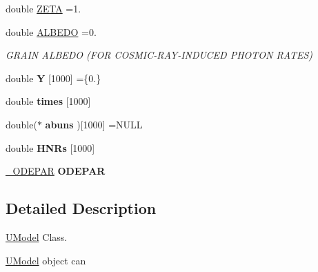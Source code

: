 \begin{DoxyCompactItemize}
\item 
double \hyperlink{classUModel_aa8280e76ef6df680f23902d267450c04}{Z\+E\+TA} =1.
\item 
\mbox{\label{classUModel_acaed1acb0533429fc4784fb79f0de04c}} 
double \hyperlink{classUModel_acaed1acb0533429fc4784fb79f0de04c}{A\+L\+B\+E\+DO} =0.
\begin{DoxyCompactList}\small\item\em G\+R\+A\+IN A\+L\+B\+E\+DO (F\+OR C\+O\+S\+M\+I\+C-\/\+R\+A\+Y-\/\+I\+N\+D\+U\+C\+ED P\+H\+O\+T\+ON R\+A\+T\+ES) \end{DoxyCompactList}\item 
\mbox{\label{classUModel_a52a0fd62c367b920dc639fc56e022133}} 
double {\bfseries Y} \mbox{[}1000\mbox{]} =\{0.\}
\item 
\mbox{\label{classUModel_a3b789d852868644369e5839199da7646}} 
double {\bfseries times} \mbox{[}1000\mbox{]}
\item 
\mbox{\label{classUModel_ad75bb930f60c12c93600ce93db09efd3}} 
double($\ast$ {\bfseries abuns} )\mbox{[}1000\mbox{]} =N\+U\+LL
\item 
\mbox{\label{classUModel_a861ac76efe016adcbb6528a5e15c0808}} 
double {\bfseries H\+N\+Rs} \mbox{[}1000\mbox{]}
\item 
\mbox{\label{classUModel_ac7082bd1b75f39d1b349415dc9153e58}} 
\hyperlink{structUModel_1_1__ODEPAR}{\+\_\+\+O\+D\+E\+P\+AR} {\bfseries O\+D\+E\+P\+AR}
\end{DoxyCompactItemize}


\subsection{Detailed Description}
\hyperlink{classUModel}{U\+Model} Class. 

\hyperlink{classUModel}{U\+Model} object can


